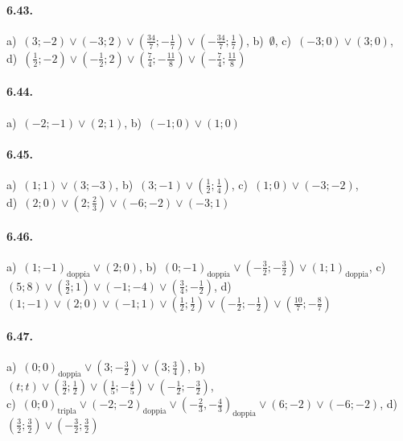 \paragraph{6.43.} 
a)~\((3;-2)\vee(-3;2)\vee\left(\frac{34} 7;-\frac 1 7\right)\vee 
\left(-\frac{34} 7;\frac 1 7\right)\),\quad 
b)~\(\emptyset\),\quad 
c)~\((-3;0)\vee(3;0)\),\protect\\
\quad 
d)~\(\left(\frac 1 2;-2\right)\vee\left(-\frac 1 2;2\right)\vee
\left(\frac 7 4;-\frac{11} 8\right)\vee
\left(-\frac 7 4;\frac{11} 8\right)\)

\paragraph{6.44.} 
a)~\((-2;-1)\vee(2;1)\),\quad 
b)~\((-1;0)\vee(1;0)\)

\paragraph{6.45.} 
a)~\((1;1)\vee(3;-3)\),\quad 
b)~\((3;-1)\vee\left(\frac 1 2;\frac 1 
4\right)\),\quad 
c)~\((1;0)\vee(-3;-2)\),\protect\\
\quad 
d)~\((2;0)\vee\left(2;\frac 2 3\right)\vee(-6;-2)\vee(-3;1)\)

\paragraph{6.46.} 
a)~\((1;-1)_\text{doppia} \vee(2;0)\),\quad 
b)~\((0;-1)_\text{doppia}\vee\left(-\frac 3 2;-\frac 3 
2\right)\vee(1;1)_\text{doppia}\),\quad 
c)~\((5;8)\vee\left(\frac 3 
2;1\right)\vee(-1;-4)\vee\left(\frac 3 4;-\frac 1 2\right)\),\quad 
d)~\((1;-1)\vee(2;0)\vee(-1;1)\vee\left(\frac 1 2;\frac 1 
2\right)\vee\left(-\frac 1 2;-\frac 1 2\right)\vee
\left(\frac{10} 7;-\frac 8 7\right)\)

\paragraph{6.47.}
a)~\((0;0)_\text{doppia}\vee\left(3;-\frac 3 2\right)\vee(3;\frac 3 4)\),
\quad 
b)~\((t;t)\vee\left(\frac 3 2;\frac 1 2\right)\vee\left(\frac 1 5;-\frac 4 
5\right)\vee\left(-\frac 1 2;-\frac 3 2\right)\),\protect\\
\quad 
c)~\((0;0)_\text{tripla}\vee(-2;-2)_\text{doppia}\vee\left(-\frac 2 3,-
\frac 4 3\right)_\text{doppia}\vee(6;-2)\vee(-6;-2)\),\quad 
d)~\(\left(\frac 3 2;\frac 3 2\right)\vee\left(-\frac 3 2;\frac 3 2\right)
\)

